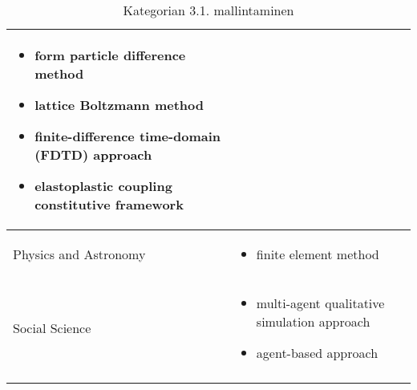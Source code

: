 \documentclass[utf8]{gradu3}
\begin{document}
\begin{longtable}[h]{|p{5cm}|p{8cm}|}
\begin{itemize}
        \item form particle difference method
        \item lattice Boltzmann method
        \item finite-difference time-domain (FDTD) approach
        \item elastoplastic coupling constitutive framework
    \end{itemize} \\
    \hline
    Physics and Astronomy & \begin{itemize}
        \item finite element method
    \end{itemize} \\
    \hline
    Social Science & \begin{itemize}
        \item multi-agent qualitative simulation approach
        \item agent-based approach
    \end{itemize} \\
    \hline
    \caption{Kategorian 3.1. mallintaminen}
    \label{table:Kategorian 3.1. mallintaminen}
\end{longtable}
\end{document}
